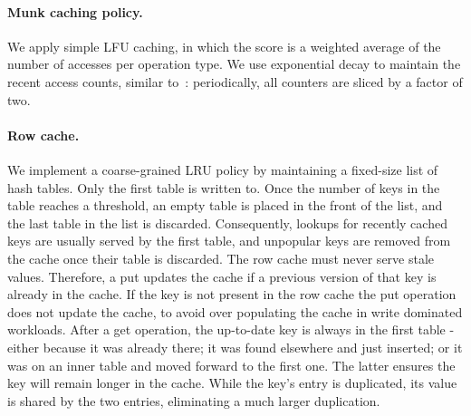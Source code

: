 \paragraph{Munk caching policy.}
We apply simple LFU caching,
in which the score is a weighted average of the number of accesses per operation type. We 
use exponential decay to maintain the recent access counts, similar to~\cite{tinyLFU}: periodically, all counters are 
sliced by a factor of two. 



\paragraph{Row cache.} 
We implement a coarse-grained LRU policy by maintaining a fixed-size list of hash tables. Only the first table is written to. Once the number of keys in the table reaches a threshold, an empty table is placed in the front of the list, and the last table in the list is discarded. Consequently, lookups for recently cached keys are usually served by the first table, and unpopular keys are removed from the cache once their table is discarded.
The row cache must never serve stale values. %
Therefore, a put updates the cache  if a previous version of that key is already in the cache. 
If the key is not present in the row cache the put operation does not update the cache, to avoid over populating the cache in write dominated workloads. 
After a get operation, the up-to-date key is always in the first table - either because it was already there; it was found elsewhere and just inserted; or it was on an inner table and moved forward to the first one. The latter ensures the key will remain longer in the cache. While the key's entry is duplicated, its value is shared by the two entries, eliminating a much larger duplication.

